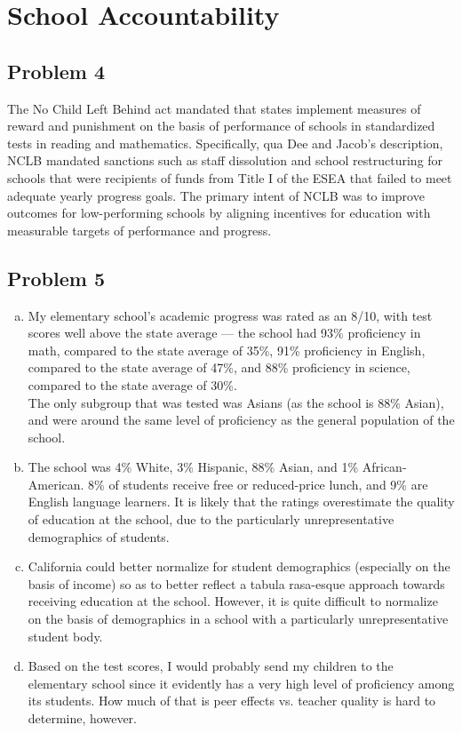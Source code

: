 \documentclass[12pt]{extarticle}
\begin{document}
  \section{School Accountability}%
  \subsection{Problem 4}%
  The No Child Left Behind act mandated that states implement measures of reward and punishment on the basis of performance of schools in standardized tests in reading and mathematics. Specifically, qua Dee and Jacob's description, NCLB mandated sanctions such as staff dissolution and school restructuring for schools that were recipients of funds from Title I of the ESEA that failed to meet adequate yearly progress goals. The primary intent of NCLB was to improve outcomes for low-performing schools by aligning incentives for education with measurable targets of performance and progress.
  \subsection{Problem 5}%
  \begin{enumerate}[(a)]
    \item My elementary school's academic progress was rated as an 8/10, with test scores well above the state average --- the school had 93\% proficiency in math, compared to the state average of 35\%, 91\% proficiency in English, compared to the state average of 47\%, and 88\% proficiency in science, compared to the state average of 30\%.\\

      The only subgroup that was tested was Asians (as the school is 88\% Asian), and were around the same level of proficiency as the general population of the school.
    \item The school was 4\% White, 3\% Hispanic, 88\% Asian, and 1\% African-American. 8\% of students receive free or reduced-price lunch, and 9\% are English language learners. It is likely that the ratings overestimate the quality of education at the school, due to the particularly unrepresentative demographics of students.
    \item California could better normalize for student demographics (especially on the basis of income) so as to better reflect a tabula rasa-esque approach towards receiving education at the school. However, it is quite difficult to normalize on the basis of demographics in a school with a particularly unrepresentative student body.
    \item Based on the test scores, I would probably send my children to the elementary school since it evidently has a very high level of proficiency among its students. How much of that is peer effects vs. teacher quality is hard to determine, however.
  \end{enumerate}
\end{document}
